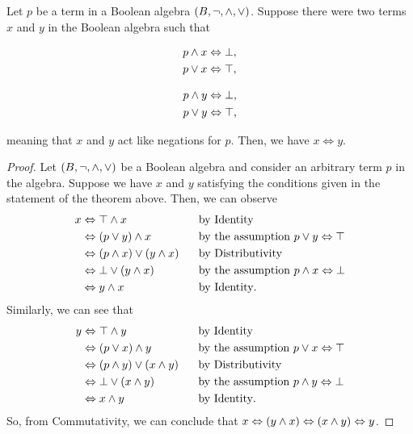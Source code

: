 \newpage

\begin{theorem}\label{thm:unique}
    Let \(p\) be a term in a Boolean algebra \((B, \neg, \wedge, \vee)\).
    Suppose there were two terms \(x\) and \(y\) in the Boolean algebra such that
    \begin{center}
        \vspace{-\parskip-\abovedisplayskip}
        \begin{minipage}{.2\linewidth}
            \begin{align*}
                p \wedge x &\Leftrightarrow \bot,\\
                p \vee x &\Leftrightarrow \top,
            \end{align*}
        \end{minipage}%
        \begin{minipage}{.2\linewidth}
            \begin{align*}
                p \wedge y &\Leftrightarrow \bot,\\
                p \vee y &\Leftrightarrow \top,
            \end{align*}
        \end{minipage}
    \end{center}
    meaning that \(x\) and \(y\) act like negations for \(p\).
    Then, we have \(x \iff y\).
\end{theorem}
\begin{proof}
    Let \((B, \neg, \wedge, \vee)\) be a Boolean algebra
    and consider an arbitrary term \(p\) in the algebra.
    Suppose we have \(x\) and \(y\) satisfying the conditions given in the statement of the theorem above.
    Then, we can observe
    \begin{alignat*}{2}
        x &\Leftrightarrow \top \wedge x ~~~~~~~~~~~~~~~~&&\text{by Identity}\\
          &\Leftrightarrow (p \vee y) \wedge x &&\text{by the assumption \(p \vee y \Leftrightarrow\top\)}\\
          &\Leftrightarrow (p \wedge x) \vee (y \wedge x) &&\text{by Distributivity}\\
          &\Leftrightarrow \bot \vee (y \wedge x) &&\text{by the assumption \(p \wedge x \Leftrightarrow\bot\)}\\
          &\Leftrightarrow y \wedge x &&\text{by Identity}.
    \end{alignat*}
    Similarly, we can see that
    \begin{alignat*}{2}
        y &\Leftrightarrow \top \wedge y ~~~~~~~~~~~~~~~~&&\text{by Identity}\\
          &\Leftrightarrow (p \vee x) \wedge y &&\text{by the assumption \(p \vee x \Leftrightarrow\top\)}\\
          &\Leftrightarrow (p \wedge y) \vee (x \wedge y) &&\text{by Distributivity}\\
          &\Leftrightarrow \bot \vee (x \wedge y) &&\text{by the assumption \(p \wedge y \Leftrightarrow\bot\)}\\
          &\Leftrightarrow x \wedge y &&\text{by Identity}.
    \end{alignat*}
    So, from Commutativity, we can conclude that \(x \Leftrightarrow (y \wedge x) \Leftrightarrow (x \wedge y) \Leftrightarrow y\).
\end{proof}

